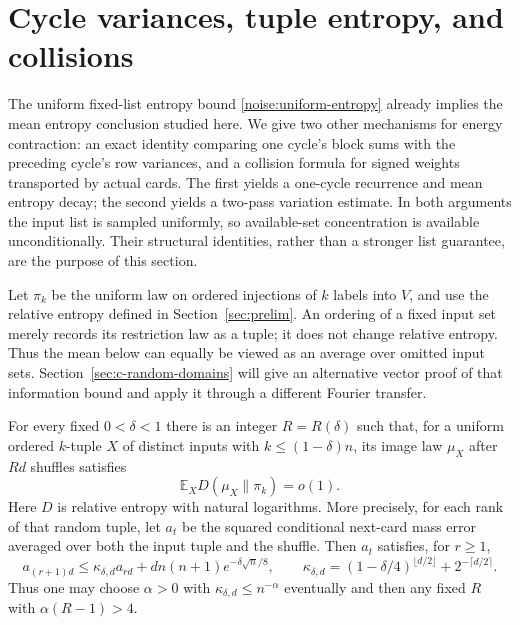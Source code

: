 \section{Cycle variances, tuple entropy, and collisions}
\label{lifts:cycle-information}

The uniform fixed-list entropy bound \eqref{noise:uniform-entropy}
already implies the mean entropy conclusion studied here. We give two
other mechanisms for energy contraction: an exact identity comparing
one cycle's block sums with the preceding cycle's row variances, and
a collision formula for signed weights transported by actual cards.
The first yields a one-cycle recurrence and mean entropy decay; the
second yields a two-pass variation estimate. In both arguments the
input list is sampled uniformly, so available-set concentration is
available unconditionally. Their structural identities, rather than
a stronger list guarantee, are the purpose of this section.

Let $\pi_k$ be the uniform law on ordered injections of $k$ labels into
$V$, and use the relative entropy defined in Section~\ref{sec:prelim}.
An ordering of a fixed input set merely records its restriction law as
a tuple; it does not change relative entropy. Thus the mean below can
equally be viewed as an average over omitted input sets. Section~\ref{sec:c-random-domains}
will give an alternative vector proof of that information bound and
apply it through a different Fourier transfer.

\begin{proposition}
\label{lifts:cycle-entropy}
For every fixed $0<\delta<1$ there is an integer $R=R(\delta)$ such that,
for a uniform ordered $k$-tuple $X$ of distinct inputs with
$k\le(1-\delta)n$, its image law $\mu_X$ after $Rd$ shuffles satisfies
\[
 \mathbb E_X D(\mu_X\|\pi_k)=o(1).
\]
Here $D$ is relative entropy with natural logarithms. More precisely,
for each rank of that random tuple, let $a_t$ be the squared
conditional next-card mass error averaged over both the input tuple
and the shuffle. Then $a_t$ satisfies, for $r\ge1$,
\begin{equation}
 a_{(r+1)d}\le \kappa_{\delta,d} a_{rd}
       +d n(n+1)e^{-\delta\sqrt n/8},\qquad
 \kappa_{\delta,d}=(1-\delta/4)^{\lfloor d/2\rfloor}
                         +2^{-\lceil d/2\rceil}.
 \label{lifts:cycle-recurrence}
\end{equation}
Thus one may choose $\alpha>0$ with $\kappa_{\delta,d}\le n^{-\alpha}$ eventually
and then any fixed $R$ with $\alpha(R-1)>4$.
\end{proposition}

